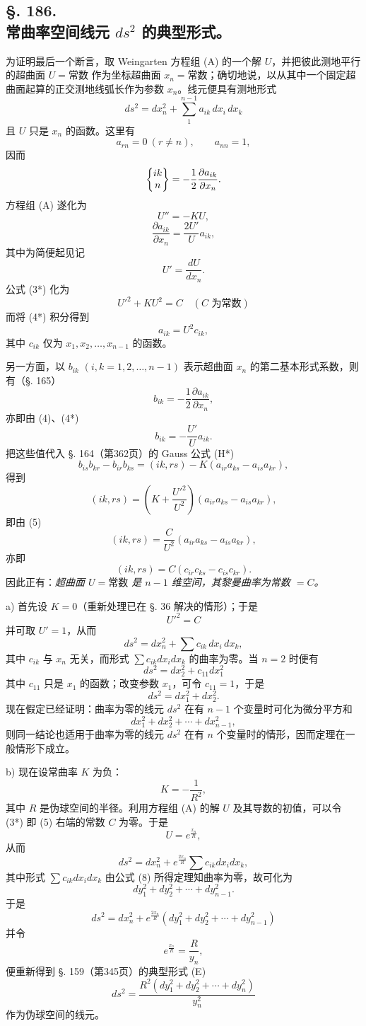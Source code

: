 \subsection*{§. 186.\\ 常曲率空间线元 $ds^2$ 的典型形式。}

为证明最后一个断言，取 Weingarten 方程组 (A) 的一个解 $U$，并把彼此测地平行的超曲面 $U=\text{常数}$ 作为坐标超曲面 $x_n=\text{常数}$；确切地说，以从其中一个固定超曲面起算的正交测地线弧长作为参数 $x_n$。线元便具有测地形式
\[
 ds^2=dx_n^2+\sum_{1}^{n-1}a_{ik}\,dx_i\,dx_k
\]
且 $U$ 只是 $x_n$ 的函数。这里有
\[
 a_{rn}=0\ (r\ne n),\qquad a_{nn}=1,
\]
因而
\[
 \left\{\begin{matrix}ik\\n\end{matrix}\right\}=-\frac12\frac{\partial a_{ik}}{\partial x_n}.
\]
方程组 (A) 遂化为
\[
\tag{4}
 U''=-KU,
\]
\[
\tag{4*}
 \frac{\partial a_{ik}}{\partial x_n}=\frac{2U'}{U}a_{ik},
\]
其中为简便起见记
\[
 U'=\frac{dU}{dx_n}.
\]
公式 (3*) 化为
\[
\tag{5}
 U'^2+KU^2=C\quad(C\text{ 为常数})
\]
而将 (4*) 积分得到
\[
\tag{6}
 a_{ik}=U^2c_{ik},
\]
其中 $c_{ik}$ 仅为 $x_1,x_2,\ldots,x_{n-1}$ 的函数。

另一方面，以 $b_{ik}$ $(i,k=1,2,\ldots,n-1)$ 表示超曲面 $x_n$ 的第二基本形式系数，则有（§. 165）
\[
 b_{ik}=-\frac12\frac{\partial a_{ik}}{\partial x_n},
\]
亦即由 (4)、(4*)
\[
\tag{7}
 b_{ik}= -\frac{U'}{U}a_{ik}.
\]
把这些值代入 §. 164（第362页）的 Gauss 公式 (H*)
\[
 b_{is}b_{kr}-b_{ir}b_{ks}=(ik,rs)-K(a_{ir}a_{ks}-a_{is}a_{kr}),
\]
得到
\[
\tag{8'}
 (ik,rs)=\left(K+\frac{U'^2}{U^2}\right)(a_{ir}a_{ks}-a_{is}a_{kr}),
\]
即由 (5)
\[
 (ik,rs)=\frac{C}{U^2}(a_{ir}a_{ks}-a_{is}a_{kr}),
\]
亦即
\[
\tag{8}
 (ik,rs)=C(c_{ir}c_{ks}-c_{is}c_{kr}).
\]
因此正有：\emph{超曲面 $U=\text{常数}$ 是 $n-1$ 维空间，其黎曼曲率为常数 $=C$。}

a) 首先设 $K=0$（重新处理已在 §. 36 解决的情形）；于是
\[
 U'^2=C
\]
并可取 $U'=1$，从而
\[
 ds^2=dx_n^2+\sum c_{ik}\,dx_i\,dx_k,
\]
其中 $c_{ik}$ 与 $x_n$ 无关，而形式 $\sum c_{ik}dx_i dx_k$ 的曲率为零。当 $n=2$ 时便有
\[
 ds^2=dx_2^2+c_{11}dx_1^2
\]
其中 $c_{11}$ 只是 $x_1$ 的函数；改变参数 $x_1$，可令 $c_{11}=1$，于是
\[
 ds^2=dx_1^2+dx_2^2.
\]
现在假定已经证明：曲率为零的线元 $ds^2$ 在有 $n-1$ 个变量时可化为微分平方和
\[
 dx_1^2+dx_2^2+\cdots+dx_{n-1}^2,
\]
则同一结论也适用于曲率为零的线元 $ds^2$ 在有 $n$ 个变量时的情形，因而定理在一般情形下成立。

b) 现在设常曲率 $K$ 为负：
\[
 K=-\frac1{R^2},
\]
其中 $R$ 是伪球空间的半径。利用方程组 (A) 的解 $U$ 及其导数的初值，可以令 (3*) 即 (5) 右端的常数 $C$ 为零。于是
\[
 U=e^{\frac{x_n}{R}},
\]
从而
\[
 ds^2=dx_n^2+e^{\frac{2x_n}{R}}\sum c_{ik}dx_i dx_k,
\]
其中形式 $\sum c_{ik}dx_i dx_k$ 由公式 (8) 所得定理知曲率为零，故可化为
\[
 dy_1^2+dy_2^2+\cdots+dy_{n-1}^2.
\]
于是
\[
 ds^2=dx_n^2+e^{\frac{2x_n}{R}}(dy_1^2+dy_2^2+\cdots+dy_{n-1}^2)
\]
并令
\[
 e^{\frac{x_n}{R}}=\frac{R}{y_n},
\]
便重新得到 §. 159（第345页）的典型形式 (E)
\[
\tag{I}
 ds^2=\frac{R^2(dy_1^2+dy_2^2+\cdots+dy_n^2)}{y_n^2}
\]
作为伪球空间的线元。

